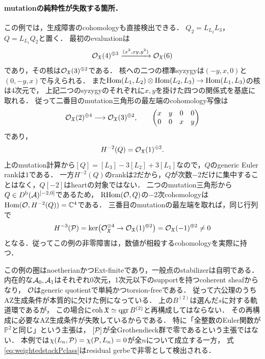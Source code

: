 \documentclass[11pt,a4paper]{ltjsarticle}
\begin{document}
\paragraph{mutationの純粋性が失敗する箇所．}
この例では，生成障害のcohomologyも直接検出できる．
$Q_2=L_{L_2}L_3$，$Q=L_{L_1}Q_2$と置く．
最初のevaluationは
\[
 \mathcal O_{\mathfrak X}(4)^{\oplus3}
 \xrightarrow{(x^2,xy,y^2)}\mathcal O_{\mathfrak X}(6)
\]
であり，その核は$\mathcal O_{\mathfrak X}(3)^{\oplus2}$である．
核への二つの標準syzygyは$(-y,x,0)$と$(0,-y,x)$で与えられる．
また$\operatorname{Hom}(L_1,L_2)\otimes\operatorname{Hom}(L_2,L_3)\to\operatorname{Hom}(L_1,L_3)$の核は4次元で，
上記二つのsyzygyのそれぞれに$x,y$を掛けた四つの関係式を基底に取れる．
従って二番目のmutation三角形の最左端のcohomology写像は
\[
 \mathcal O_{\mathfrak X}(2)^{\oplus4}\longrightarrow
 \mathcal O_{\mathfrak X}(3)^{\oplus2},\qquad
 \begin{pmatrix}x&y&0&0\\0&0&x&y\end{pmatrix}
\]
であり，
\[
 H^{-2}(Q)=\mathcal O_{\mathfrak X}(1)^{\oplus2}.
\]
上のmutation計算から$[Q]=[L_3]-3[L_2]+3[L_1]$なので，$Q$のgeneric Euler rankは$1$である．
一方$H^{-2}(Q)$のrankは$2$だから，$Q$が次数$-2$だけに集中することはなく，$Q[-2]$はheartの対象ではない．
二つのmutation三角形から$Q\in D^{\mathrm b}(\mathcal A)^{[-2,0]}$であるため，
$\operatorname{RHom}(\mathcal O,Q)$の$-2$次cohomologyは
$\operatorname{Hom}(\mathcal O,H^{-2}(Q))=\mathbb C^4$である．
三番目のmutationの最左端を取れば，同じ行列で
\[
 H^{-3}(\mathcal P)=
 \ker\bigl(\mathcal O_{\mathfrak X}^{\oplus4}\to
              \mathcal O_{\mathfrak X}(1)^{\oplus2}\bigr)
 =\mathcal O_{\mathfrak X}(-1)^{\oplus2}\ne0
\]
となる．従ってこの例の非零障害は，数値が相殺するcohomologyを実際に持つ．

\begin{remark}
この例の圏はnoetherianかつExt-finiteであり，一般点のstabilizerは自明である．
内在的な$\mathcal A_0,\mathcal A_1$はそれぞれ0次元，1次元以下のsupportを持つcoherent sheafからなり，
$\mathcal O$はgeneric quotientで単純かつtorsion-freeである．
従って六公理のうちAZ生成条件が本質的に欠けた例になっている．
上の$B^{(2)}$は選んだ$s$に対する軌道環であるが，
この場合に$\operatorname{coh}\mathfrak X\simeq\operatorname{qgr} B^{(2)}$と再構成してはならない．
その再構成に必要なAZ生成条件が失敗しているからである．
特に「全整数のEuler関数が$\mathbb P^2$と同じ」という主張は，
$[\mathcal P]$が全Grothendieck群で零であるという主張ではない．
本例では$\chi(L_n,\mathcal P)=\chi(\mathcal P,L_n)=0$が全$n$について成立する一方，
式\eqref{eq:weightedstackPclass}はresidual gerbeで非零として検出される．
\end{remark}
\end{document}
